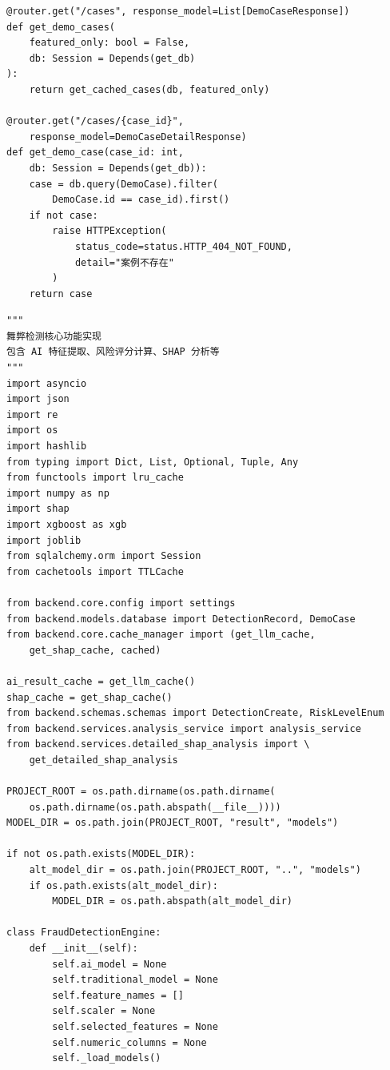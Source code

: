 \documentclass[a4paper,10pt]{article}
\begin{document}
\begin{lstlisting}
@router.get("/cases", response_model=List[DemoCaseResponse])
def get_demo_cases(
    featured_only: bool = False,
    db: Session = Depends(get_db)
):
    return get_cached_cases(db, featured_only)

@router.get("/cases/{case_id}",
    response_model=DemoCaseDetailResponse)
def get_demo_case(case_id: int,
    db: Session = Depends(get_db)):
    case = db.query(DemoCase).filter(
        DemoCase.id == case_id).first()
    if not case:
        raise HTTPException(
            status_code=status.HTTP_404_NOT_FOUND,
            detail="案例不存在"
        )
    return case
\end{lstlisting}

\begin{lstlisting}
"""
舞弊检测核心功能实现
包含 AI 特征提取、风险评分计算、SHAP 分析等
"""
import asyncio
import json
import re
import os
import hashlib
from typing import Dict, List, Optional, Tuple, Any
from functools import lru_cache
import numpy as np
import shap
import xgboost as xgb
import joblib
from sqlalchemy.orm import Session
from cachetools import TTLCache

from backend.core.config import settings
from backend.models.database import DetectionRecord, DemoCase
from backend.core.cache_manager import (get_llm_cache,
    get_shap_cache, cached)

ai_result_cache = get_llm_cache()
shap_cache = get_shap_cache()
from backend.schemas.schemas import DetectionCreate, RiskLevelEnum
from backend.services.analysis_service import analysis_service
from backend.services.detailed_shap_analysis import \
    get_detailed_shap_analysis

PROJECT_ROOT = os.path.dirname(os.path.dirname(
    os.path.dirname(os.path.abspath(__file__))))
MODEL_DIR = os.path.join(PROJECT_ROOT, "result", "models")

if not os.path.exists(MODEL_DIR):
    alt_model_dir = os.path.join(PROJECT_ROOT, "..", "models")
    if os.path.exists(alt_model_dir):
        MODEL_DIR = os.path.abspath(alt_model_dir)

class FraudDetectionEngine:
    def __init__(self):
        self.ai_model = None
        self.traditional_model = None
        self.feature_names = []
        self.scaler = None
        self.selected_features = None
        self.numeric_columns = None
        self._load_models()


\end{lstlisting}
\end{document}
